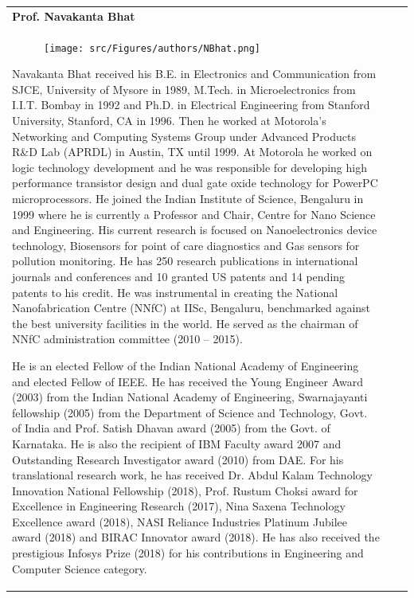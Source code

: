 \newpage
{\tabcolsep=10pt
\renewcommand{\arraystretch}{1.7}
\begin{longtable}{V{2.5}p{.95\textwidth}V{2.5}}
\centerline{\large\bf Prof. Navakanta Bhat}\\[-.5cm]

\begin{figure}
\vspace{-10pt}

\texttt{[image: src/Figures/authors/NBhat.png]}

\vspace{-5pt}
\end{figure}
Navakanta Bhat received his B.E. in Electronics and Communication from SJCE, University of Mysore in 1989, M.Tech. in Microelectronics from I.I.T. Bombay in 1992 and Ph.D. in Electrical Engineering from Stanford University, Stanford, CA in 1996. Then he worked at Motorola’s Networking and Computing Systems Group under Advanced Products R\&D Lab (APRDL)  in Austin, TX until 1999. At Motorola he worked on logic technology development and he was responsible for developing high performance transistor design and dual gate oxide technology for PowerPC microprocessors. He joined the Indian Institute of Science, Bengaluru in 1999 where he is currently a Professor and Chair, Centre for Nano Science and Engineering. His current research is focused on Nanoelectronics device technology, Biosensors for point of care diagnostics and Gas sensors for pollution monitoring. He has 250 research publications in international journals and conferences and 10 granted US patents and 14 pending patents to his credit. He was instrumental in creating the National Nanofabrication Centre (NNfC) at IISc, Bengaluru, benchmarked against the best university facilities in the world. He served as the chairman of NNfC administration committee (2010 – 2015).

\bigskip

He is an elected Fellow of the Indian National Academy of Engineering and elected Fellow of IEEE. He has received the Young Engineer Award (2003) from the Indian National Academy of Engineering, Swarnajayanti fellowship (2005) from the Department of Science and Technology, Govt. of India and Prof. Satish Dhavan award (2005) from the Govt. of Karnataka. He is also the recipient of IBM Faculty award 2007 and Outstanding Research Investigator award (2010) from DAE. For his translational research work, he has received Dr. Abdul Kalam Technology Innovation National Fellowship (2018), Prof. Rustum Choksi award for Excellence in Engineering Research (2017), Nina Saxena Technology Excellence award (2018), NASI Reliance Industries Platinum Jubilee award (2018) and BIRAC Innovator award (2018). He has also received the prestigious Infosys Prize (2018) for his contributions in Engineering and Computer Science category. 


\end{longtable}}
